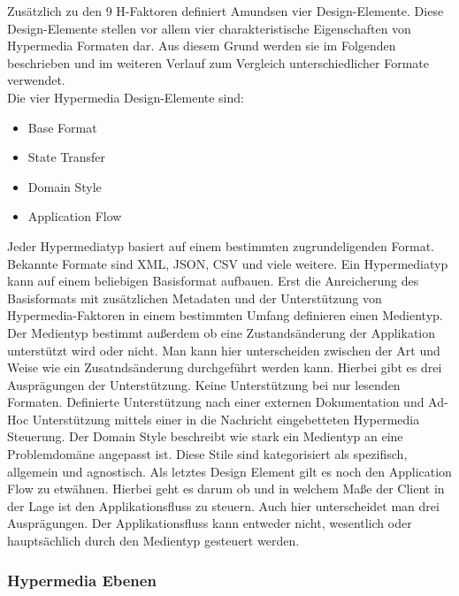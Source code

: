 Zusätzlich zu den 9 H-Faktoren definiert Amundsen vier Design-Elemente. Diese Design-Elemente stellen vor allem vier charakteristische Eigenschaften von Hypermedia Formaten dar. Aus diesem Grund werden sie im Folgenden beschrieben und im weiteren Verlauf zum Vergleich unterschiedlicher Formate verwendet.\\
Die vier Hypermedia Design-Elemente sind:
\begin{itemize}
\item Base Format
\item State Transfer
\item Domain Style
\item Application Flow
\end{itemize}

Jeder Hypermediatyp basiert auf einem bestimmten zugrundeligenden Format. Bekannte Formate sind XML, JSON, CSV und viele weitere. Ein Hypermediatyp kann auf einem beliebigen Basisformat aufbauen. Erst die Anreicherung des Basisformats mit zusätzlichen Metadaten und der Unterstützung von Hypermedia-Faktoren in einem bestimmten Umfang definieren einen Medientyp. Der Medientyp bestimmt außerdem ob eine Zustandsänderung der Applikation unterstützt wird oder nicht. Man kann hier unterscheiden zwischen der Art und Weise wie ein Zusatndsänderung durchgeführt werden kann. Hierbei gibt es drei Ausprägungen der Unterstützung. Keine Unterstützung bei nur lesenden Formaten. Definierte Unterstützung nach einer externen Dokumentation und Ad-Hoc Unterstützung mittels einer in die Nachricht eingebetteten Hypermedia Steuerung. Der Domain Style beschreibt wie stark ein Medientyp an eine Problemdomäne angepasst ist. Diese Stile sind kategorisiert als spezifisch, allgemein und agnostisch. Als letztes Design Element gilt es noch den Application Flow zu etwähnen. Hierbei geht es darum ob und in welchem Maße der Client in der Lage ist den Applikationsfluss zu steuern. Auch hier unterscheidet man drei Ausprägungen. Der Applikationsfluss kann entweder nicht, wesentlich oder hauptsächlich durch den Medientyp gesteuert werden.\\

\subsubsection{Hypermedia Ebenen}

